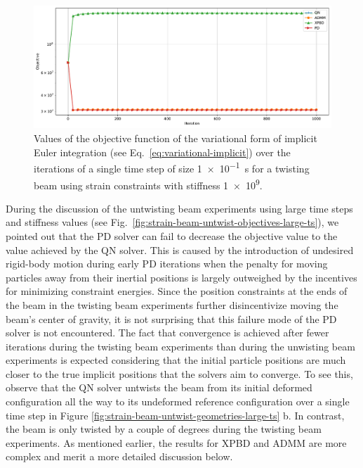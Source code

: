 \begin{figure}[h]
    \includegraphics[width=\textwidth]{figures/strain_beam_twist_typical_objectives.pdf}
    \caption{Values of the objective function of the variational form of implicit Euler integration (see Eq.\ \ref{eq:variational-implicit}) over the iterations of 
        a single time step of size \SI{1e-1}{\second} for a twisting beam using strain constraints with stiffness \num{1e9}.}
    \label{fig:strain-beam-twist-typical-objectives}
\end{figure}

During the discussion of the untwisting beam experiments using large time steps and stiffness values (see Fig.\ \ref{fig:strain-beam-untwist-objectives-large-ts}),
we pointed out that the PD solver can fail to decrease the objective value to the value achieved by the QN solver. This is caused by the introduction of 
undesired rigid-body motion during early PD iterations when the penalty for moving particles away from their inertial positions is largely outweighed by the incentives 
for minimizing constraint energies. Since the position constraints at the ends of the beam in the twisting beam experiments further disincentivize moving the beam's 
center of gravity, it is not surprising that this failure mode of the PD solver is not encountered. The fact that convergence is achieved after fewer iterations 
during the twisting beam experiments than during the unwisting beam experiments is expected considering that the initial particle positions are much closer to the true 
implicit positions that the solvers aim to converge. To see this, observe that the QN solver untwists the beam from its initial deformed configuration all the way to its 
undeformed reference configuration over a single time step in Figure \ref{fig:strain-beam-untwist-geometries-large-ts} b. In contrast, the beam is only twisted by a 
couple of degrees during the twisting beam experiments. As mentioned earlier, the results for XPBD and ADMM are more complex and merit a more detailed discussion below.

